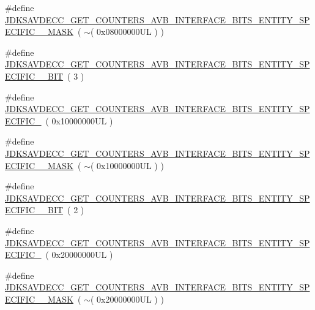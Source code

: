 \begin{DoxyCompactItemize}
\item 
\#define \hyperlink{group__get__counters__avb__interface__bits_gaf523ea2f23ca209769368435c09e3782}{J\+D\+K\+S\+A\+V\+D\+E\+C\+C\+\_\+\+G\+E\+T\+\_\+\+C\+O\+U\+N\+T\+E\+R\+S\+\_\+\+A\+V\+B\+\_\+\+I\+N\+T\+E\+R\+F\+A\+C\+E\+\_\+\+B\+I\+T\+S\+\_\+\+E\+N\+T\+I\+T\+Y\+\_\+\+S\+P\+E\+C\+I\+F\+I\+C\+\_\+\_\+\+M\+A\+SK}~( $\sim$( 0x08000000\+U\+L ) )
\item 
\#define \hyperlink{group__get__counters__avb__interface__bits_gafd2b114d968ddc77cd353da8ca56be01}{J\+D\+K\+S\+A\+V\+D\+E\+C\+C\+\_\+\+G\+E\+T\+\_\+\+C\+O\+U\+N\+T\+E\+R\+S\+\_\+\+A\+V\+B\+\_\+\+I\+N\+T\+E\+R\+F\+A\+C\+E\+\_\+\+B\+I\+T\+S\+\_\+\+E\+N\+T\+I\+T\+Y\+\_\+\+S\+P\+E\+C\+I\+F\+I\+C\+\_\+\_\+\+B\+IT}~( 3 )
\item 
\#define \hyperlink{group__get__counters__avb__interface__bits_ga448dce285aebb2a1834296c1c77631d2}{J\+D\+K\+S\+A\+V\+D\+E\+C\+C\+\_\+\+G\+E\+T\+\_\+\+C\+O\+U\+N\+T\+E\+R\+S\+\_\+\+A\+V\+B\+\_\+\+I\+N\+T\+E\+R\+F\+A\+C\+E\+\_\+\+B\+I\+T\+S\+\_\+\+E\+N\+T\+I\+T\+Y\+\_\+\+S\+P\+E\+C\+I\+F\+I\+C\+\_}~( 0x10000000\+U\+L )
\item 
\#define \hyperlink{group__get__counters__avb__interface__bits_gac23d7142fe78b23c27911540a31895c3}{J\+D\+K\+S\+A\+V\+D\+E\+C\+C\+\_\+\+G\+E\+T\+\_\+\+C\+O\+U\+N\+T\+E\+R\+S\+\_\+\+A\+V\+B\+\_\+\+I\+N\+T\+E\+R\+F\+A\+C\+E\+\_\+\+B\+I\+T\+S\+\_\+\+E\+N\+T\+I\+T\+Y\+\_\+\+S\+P\+E\+C\+I\+F\+I\+C\+\_\+\_\+\+M\+A\+SK}~( $\sim$( 0x10000000\+U\+L ) )
\item 
\#define \hyperlink{group__get__counters__avb__interface__bits_ga6fedf70d35f41650eb9bd2d21da2deaf}{J\+D\+K\+S\+A\+V\+D\+E\+C\+C\+\_\+\+G\+E\+T\+\_\+\+C\+O\+U\+N\+T\+E\+R\+S\+\_\+\+A\+V\+B\+\_\+\+I\+N\+T\+E\+R\+F\+A\+C\+E\+\_\+\+B\+I\+T\+S\+\_\+\+E\+N\+T\+I\+T\+Y\+\_\+\+S\+P\+E\+C\+I\+F\+I\+C\+\_\+\_\+\+B\+IT}~( 2 )
\item 
\#define \hyperlink{group__get__counters__avb__interface__bits_ga71f26a9c60d6de7444ee539c2ec3ce26}{J\+D\+K\+S\+A\+V\+D\+E\+C\+C\+\_\+\+G\+E\+T\+\_\+\+C\+O\+U\+N\+T\+E\+R\+S\+\_\+\+A\+V\+B\+\_\+\+I\+N\+T\+E\+R\+F\+A\+C\+E\+\_\+\+B\+I\+T\+S\+\_\+\+E\+N\+T\+I\+T\+Y\+\_\+\+S\+P\+E\+C\+I\+F\+I\+C\+\_}~( 0x20000000\+U\+L )
\item 
\#define \hyperlink{group__get__counters__avb__interface__bits_ga42d56a7c05939e308239582cf205f36b}{J\+D\+K\+S\+A\+V\+D\+E\+C\+C\+\_\+\+G\+E\+T\+\_\+\+C\+O\+U\+N\+T\+E\+R\+S\+\_\+\+A\+V\+B\+\_\+\+I\+N\+T\+E\+R\+F\+A\+C\+E\+\_\+\+B\+I\+T\+S\+\_\+\+E\+N\+T\+I\+T\+Y\+\_\+\+S\+P\+E\+C\+I\+F\+I\+C\+\_\+\_\+\+M\+A\+SK}~( $\sim$( 0x20000000\+U\+L ) )

\end{DoxyCompactItemize}
